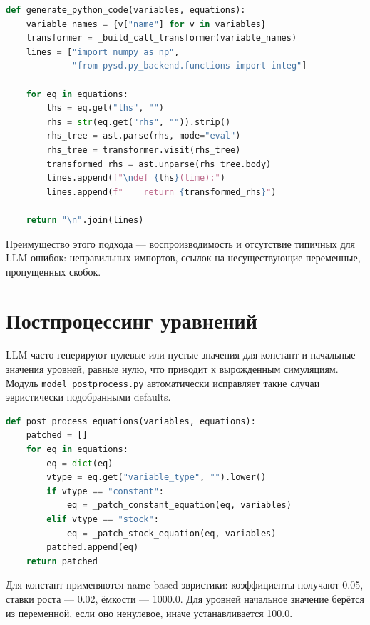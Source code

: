 \begin{lstlisting}[caption={Детерминированная генерация Python-кода (упрощённо)}, language=Python, basicstyle=\ttfamily\scriptsize]
def generate_python_code(variables, equations):
    variable_names = {v["name"] for v in variables}
    transformer = _build_call_transformer(variable_names)
    lines = ["import numpy as np",
             "from pysd.py_backend.functions import integ"]

    for eq in equations:
        lhs = eq.get("lhs", "")
        rhs = str(eq.get("rhs", "")).strip()
        rhs_tree = ast.parse(rhs, mode="eval")
        rhs_tree = transformer.visit(rhs_tree)
        transformed_rhs = ast.unparse(rhs_tree.body)
        lines.append(f"\ndef {lhs}(time):")
        lines.append(f"    return {transformed_rhs}")

    return "\n".join(lines)
\end{lstlisting}

Преимущество этого подхода --- воспроизводимость и отсутствие типичных для LLM ошибок: неправильных импортов, ссылок на несуществующие переменные, пропущенных скобок.


\section{Постпроцессинг уравнений}

LLM часто генерируют нулевые или пустые значения для констант и начальные значения уровней, равные нулю, что приводит к вырожденным симуляциям. Модуль \texttt{model\_postprocess.py} автоматически исправляет такие случаи эвристически подобранными defaults.

\begin{lstlisting}[caption={Постпроцессинг уравнений (упрощённо)}, language=Python, basicstyle=\ttfamily\scriptsize]
def post_process_equations(variables, equations):
    patched = []
    for eq in equations:
        eq = dict(eq)
        vtype = eq.get("variable_type", "").lower()
        if vtype == "constant":
            eq = _patch_constant_equation(eq, variables)
        elif vtype == "stock":
            eq = _patch_stock_equation(eq, variables)
        patched.append(eq)
    return patched
\end{lstlisting}

Для констант применяются name-based эвристики: коэффициенты получают 0.05, ставки роста --- 0.02, ёмкости --- 1000.0. Для уровней начальное значение берётся из переменной, если оно ненулевое, иначе устанавливается 100.0.


